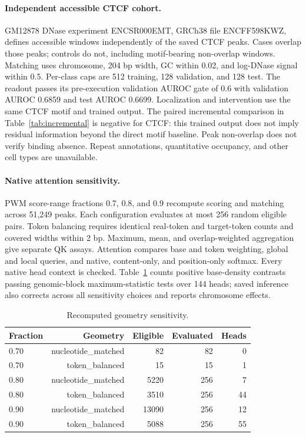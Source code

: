 \paragraph{Independent accessible CTCF cohort.}

GM12878 DNase experiment ENCSR000EMT, GRCh38 file ENCFF598KWZ, defines accessible windows independently of the saved CTCF peaks. Cases overlap those peaks; controls do not, including motif-bearing non-overlap windows. Matching uses chromosome, 204 bp width, GC within 0.02, and log-DNase signal within 0.5. Per-class caps are 512 training, 128 validation, and 128 test. The readout passes its pre-execution validation AUROC gate of 0.6 with validation AUROC 0.6859 and test AUROC 0.6699. Localization and intervention use the same CTCF motif and trained output. The paired incremental comparison in Table~\ref{tab:incremental} is negative for CTCF: this trained output does not imply residual information beyond the direct motif baseline. Peak non-overlap does not verify binding absence. Repeat annotations, quantitative occupancy, and other cell types are unavailable.

\paragraph{Native attention sensitivity.}

PWM score-range fractions 0.7, 0.8, and 0.9 recompute scoring and matching across 51,249 peaks. Each configuration evaluates at most 256 random eligible pairs. Token balancing requires identical real-token and target-token counts and covered widths within 2 bp. Maximum, mean, and overlap-weighted aggregation give separate QK assays. Attention compares base and token weighting, global and local queries, and native, content-only, and position-only softmax. Every native head context is checked. Table~\ref{tab:geometry} counts positive base-density contrasts passing genomic-block maximum-statistic tests over 144 heads; saved inference also corrects across all sensitivity choices and reports chromosome effects.

\begin{table}[t]\centering\small\caption{Recomputed geometry sensitivity.}\label{tab:geometry}

\begin{tabular}{lrrrr}
\toprule
Fraction & Geometry & Eligible & Evaluated & Heads \\
\midrule
0.70 & nucleotide\_matched & 82 & 82 & 0 \\
0.70 & token\_balanced & 15 & 15 & 1 \\
0.80 & nucleotide\_matched & 5220 & 256 & 7 \\
0.80 & token\_balanced & 3510 & 256 & 44 \\
0.90 & nucleotide\_matched & 13090 & 256 & 12 \\
0.90 & token\_balanced & 5088 & 256 & 55 \\
\bottomrule
\end{tabular}

\end{table}

